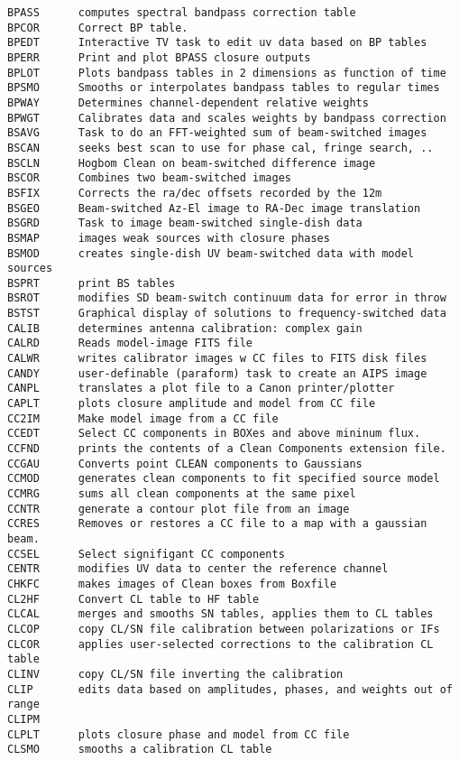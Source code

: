 \begin{verbatim}
BPASS      computes spectral bandpass correction table
BPCOR      Correct BP table.
BPEDT      Interactive TV task to edit uv data based on BP tables
BPERR      Print and plot BPASS closure outputs
BPLOT      Plots bandpass tables in 2 dimensions as function of time
BPSMO      Smooths or interpolates bandpass tables to regular times
BPWAY      Determines channel-dependent relative weights
BPWGT      Calibrates data and scales weights by bandpass correction
BSAVG      Task to do an FFT-weighted sum of beam-switched images
BSCAN      seeks best scan to use for phase cal, fringe search, ..
BSCLN      Hogbom Clean on beam-switched difference image
BSCOR      Combines two beam-switched images
BSFIX      Corrects the ra/dec offsets recorded by the 12m
BSGEO      Beam-switched Az-El image to RA-Dec image translation
BSGRD      Task to image beam-switched single-dish data
BSMAP      images weak sources with closure phases
BSMOD      creates single-dish UV beam-switched data with model sources
BSPRT      print BS tables
BSROT      modifies SD beam-switch continuum data for error in throw
BSTST      Graphical display of solutions to frequency-switched data
CALIB      determines antenna calibration: complex gain
CALRD      Reads model-image FITS file
CALWR      writes calibrator images w CC files to FITS disk files
CANDY      user-definable (paraform) task to create an AIPS image
CANPL      translates a plot file to a Canon printer/plotter
CAPLT      plots closure amplitude and model from CC file
CC2IM      Make model image from a CC file
CCEDT      Select CC components in BOXes and above mininum flux.
CCFND      prints the contents of a Clean Components extension file.
CCGAU      Converts point CLEAN components to Gaussians
CCMOD      generates clean components to fit specified source model
CCMRG      sums all clean components at the same pixel
CCNTR      generate a contour plot file from an image
CCRES      Removes or restores a CC file to a map with a gaussian beam.
CCSEL      Select signifigant CC components
CENTR      modifies UV data to center the reference channel
CHKFC      makes images of Clean boxes from Boxfile
CL2HF      Convert CL table to HF table
CLCAL      merges and smooths SN tables, applies them to CL tables
CLCOP      copy CL/SN file calibration between polarizations or IFs
CLCOR      applies user-selected corrections to the calibration CL table
CLINV      copy CL/SN file inverting the calibration
CLIP       edits data based on amplitudes, phases, and weights out of range
CLIPM
CLPLT      plots closure phase and model from CC file
CLSMO      smooths a calibration CL table

\end{verbatim}
